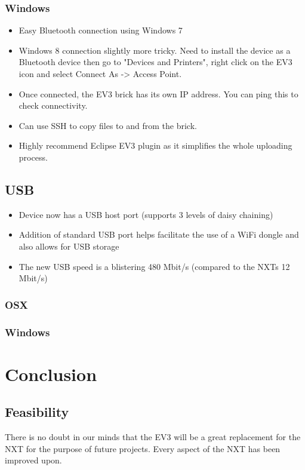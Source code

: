 \documentclass[11pt, a4paper, oneside]{article}
\begin{document}
  		\subsubsection{Windows}
		\begin{itemize}
			\item Easy Bluetooth connection using Windows 7
			\item Windows 8 connection slightly more tricky. Need to install the device as a Bluetooth device then go to "Devices and Printers", right click on the EV3 icon and select Connect As -> Access Point.
			\item Once connected, the EV3 brick has its own IP address. You can ping this to check connectivity.
			\item Can use SSH to copy files to and from the brick.
			\item Highly recommend Eclipse EV3 plugin as it simplifies the whole uploading process.
		\end{itemize}  		
  		
 	\subsection{USB}
    \begin{itemize}
      \item Device now has a USB host port (supports 3 levels of daisy chaining)
      \item Addition of standard USB port helps facilitate the use of a WiFi dongle and also allows for USB storage
      \item The new USB speed is a blistering 480 Mbit/s (compared to the NXTs 12 Mbit/s)

    \end{itemize}
 		\subsubsection{OSX}

 		\subsubsection{Windows}


   	\section{Conclusion}
   		\subsection{Feasibility}
   		There is no doubt in our minds that the EV3 will be a great replacement for the NXT for the purpose of future projects. Every aspect of the NXT has been improved upon. 
   		
\end{document}
